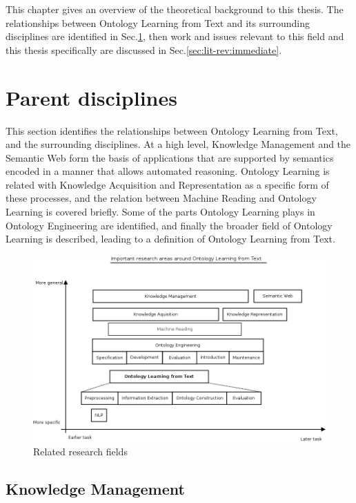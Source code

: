 \documentclass[a4paper]{report}
\begin{document}
This chapter gives an overview of the theoretical background to this thesis.
The relationships between Ontology Learning from Text and its surrounding disciplines are identified in Sec.\ref{sec:lit-rev:parents}, then work and issues relevant to this field and this thesis specifically are discussed in Sec.\ref{sec:lit-rev:immediate}.

\section{Parent disciplines}
\label{sec:lit-rev:parents}

This section identifies the relationships between Ontology Learning from Text, and the surrounding disciplines.
At a high level, Knowledge Management and the Semantic Web form the basis of applications that are supported by semantics encoded in a manner that allows automated reasoning.
Ontology Learning is related with Knowledge Acquisition and Representation as a specific form of these processes, and the relation between Machine Reading and Ontology Learning is covered briefly.
Some of the parts Ontology Learning plays in Ontology Engineering are identified, and finally the broader field of Ontology Learning is described, leading to a definition of Ontology Learning from Text.

\begin{figure}
  \includegraphics[width=\textwidth]{graphics/related-research-fields.png}
  \caption{Related research fields}
  \label{fig:related-research}
\end{figure}



\subsection{Knowledge Management}
\end{document}
